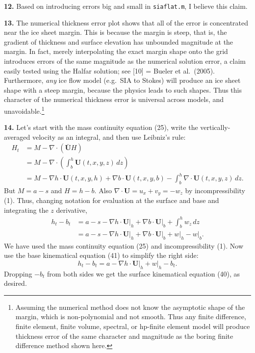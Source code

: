 \documentclass[10pt]{amsart}
\newcommand{\Div}{\nabla\cdot}
\newcommand{\grad}{\nabla}
\newcommand{\prob}[1]{\bigskip\noindent\large\textbf{#1.}\normalsize }
\begin{document}
\prob{12}  Based on introducing errors big and small in \texttt{siaflat.m}, I believe this claim.

\prob{13}  The numerical thickness error plot shows that all of the error is concentrated near the ice sheet margin.  This is because the margin is steep, that is, the gradient of thickness and surface elevation has unbounded magnitude at the margin.  In fact, merely interpolating the exact margin shape onto the grid introduces errors of the same magnitude as the numerical solution error, a claim easily tested using the Halfar solution; see [10] = Bueler et al.~(2005).  Furthermore, \emph{any} ice flow model (e.g.~SIA to Stokes) will produce an ice sheet shape with a steep margin, because the physics leads to such shapes.  Thus this character of the numerical thickness error is universal across models, and unavoidable.\footnote{Assuming the numerical method does not know the asymptotic shape of the margin, which is non-polynomial and not smooth.  Thus any finite difference, finite element, finite volume, spectral, or hp-finite element model will produce thickness error of the same character and magnitude as the boring finite difference method shown here.}

\prob{14}  Let's start with the mass continuity equation (25), write the vertically-averaged velocity as an integral, and then use Leibniz's rule:
\begin{align*}
H_t &= M - \Div \left(\bar{\mathbf{U}} H \right) \\
    &= M - \Div \left(\int_b^h \mathbf{U}(t,x,y,z)\,dz\right) \\
    &= M - \grad h\cdot \mathbf{U}(t,x,y,h) + \grad b\cdot \mathbf{U}(t,x,y,b) - \int_b^h \Div \mathbf{U}(t,x,y,z)\,dz.
\end{align*}
But $M=a-s$ and $H=h-b$.  Also $\Div \mathbf{U} = u_x + v_y = - w_z$ by incompressibility (1).  Thus, changing notation for evaluation at the surface and base and integrating the $z$ derivative,
\begin{align*}
h_t - b_t &= a - s - \grad h\cdot \mathbf{U}\big|_h + \grad b\cdot \mathbf{U}\big|_b + \int_b^h w_z\,dz \\
    &= a - s - \grad h\cdot \mathbf{U}\big|_h + \grad b\cdot \mathbf{U}\big|_b + w\big|_h - w\big|_b.
\end{align*}
We have used the mass continuity equation (25) and incompressibility (1).  Now use the base kinematical equation (41) to simplify the right side:
  $$h_t - b_t = a - \grad h\cdot \mathbf{U}\big|_h + w\big|_h - b_t.$$
Dropping $-b_t$ from both sides we get the surface kinematical equation (40), as desired.
\end{document}
